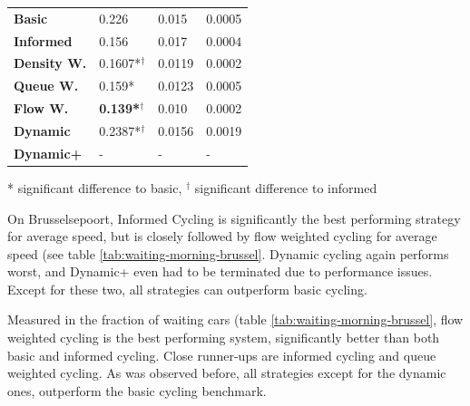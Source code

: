 \documentclass[11pt]{article}
\begin{document}
\begin{table}[t]
\begin{tabular}{l|l|l|l|}
\hline\textbf{Basic}      & 0.226          & 0.015             & 0.0005                     \\
\textbf{Informed}   & 0.156          & 0.017             & 0.0004                     \\
\hline\textbf{Density W.} & 0.1607*$^\dagger$         & 0.0119            & 0.0002                     \\
\textbf{Queue W.}   & 0.159*          & 0.0123            & 0.0005                     \\
\textbf{Flow W.}    & \textbf{0.139*$^\dagger$} & 0.010             & 0.0002                     \\
\textbf{Dynamic}    & 0.2387*$^\dagger$         & 0.0156            & 0.0019                     \\
\textbf{Dynamic+}   & -              & -                 & -                         
\end{tabular}

\small{* significant difference to basic, $^\dagger$ significant difference to informed}
\end{table}

On Brusselsepoort, Informed Cycling is significantly the best performing strategy for average speed, but is closely followed by flow weighted cycling for average speed (see table \ref{tab:waiting-morning-brussel}. Dynamic cycling again performs worst, and Dynamic+ even had to be terminated due to performance issues. Except for these two, all strategies can outperform basic cycling.

Measured in the fraction of waiting cars (table \ref{tab:waiting-morning-brussel}, flow weighted cycling is the best performing system, significantly better than both basic and informed cycling. Close runner-ups are informed cycling and queue weighted cycling. As was observed before, all strategies except for the dynamic ones, outperform the basic cycling benchmark.
\end{document}
